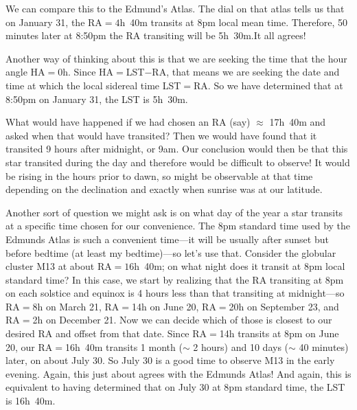 \documentclass[12pt, preprint]{aastex}
\begin{document}
We can compare this to the Edmund's Atlas. The dial on that atlas
tells us that on January 31, the RA$=4$h~40m transits at 8pm local
mean time. Therefore, 50 minutes later at 8:50pm the RA transiting
will be 5h~30m.It all agrees!

Another way of thinking about this is that we are seeking the time
that the hour angle HA$=0$h. Since HA$=$LST$-$RA, that means we are
seeking the date and time at which the local sidereal time
LST$=$RA. So we have determined that at 8:50pm on January 31, the LST
is 5h~30m.

What would have happened if we had chosen an RA (say) $\approx$
17h~40m and asked when that would have transited? Then we would have
found that it transited 9 hours after midnight, or 9am. Our conclusion
would then be that this star transited during the day and therefore
would be difficult to observe! It would be rising in the hours prior
to dawn, so might be observable at that time depending on the
declination and exactly when sunrise was at our latitude.

Another sort of question we might ask is on what day of the year a
star transits at a specific time chosen for our convenience. The 8pm
standard time used by the Edmunds Atlas is such a convenient time---it
will be usually after sunset but before bedtime (at least my
bedtime)---so let's use that. Consider the globular cluster M13 at
about RA$=16$h~40m; on what night does it transit at 8pm local
standard time? In this case, we start by realizing that the RA
transiting at 8pm on each solstice and equinox is 4 hours less than
that transiting at midnight---so RA$=$8h on March 21, RA$=$14h on June
20, RA$=$20h on September 23, and RA$=$2h on December 21. Now we can
decide which of those is closest to our desired RA and offset from
that date. Since RA$=$14h transits at 8pm on June 20, our RA$=$16h~40m
transits 1 month ($\sim$ 2 hours) and 10 days ($\sim$ 40 minutes)
later, on about July 30. So July 30 is a good time to observe M13 in
the early evening. Again, this just about agrees with the Edmunds
Atlas! And again, this is equivalent to having determined that on July
30 at 8pm standard time, the LST is 16h~40m.
\end{document}
